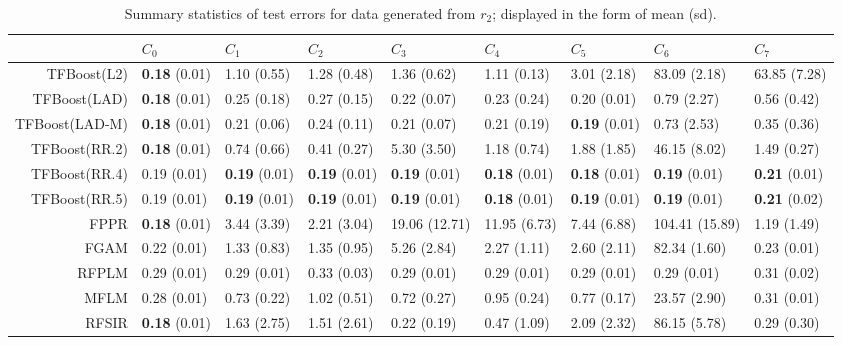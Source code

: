 \begin{table}[H]
\centering
\begin{tabular}{rllllllll}
  \hline
 & $C_0$ & $C_1$ & $C_2$ & $C_3$ & $C_4$ & $C_5$ & $C_6$ & $C_7$ \\ 
  \hline
TFBoost(L2) & \textbf{0.18} (0.01) & 1.10 (0.55) & 1.28 (0.48) & 1.36 (0.62) & 1.11 (0.13) & 3.01 (2.18) & 83.09 (2.18) & 63.85 (7.28) \\ 
  TFBoost(LAD) & \textbf{0.18} (0.01) & 0.25 (0.18) & 0.27 (0.15) & 0.22 (0.07) & 0.23 (0.24) & 0.20 (0.01) & 0.79 (2.27) & 0.56 (0.42) \\ 
  TFBoost(LAD-M) & \textbf{0.18} (0.01) & 0.21 (0.06) & 0.24 (0.11) & 0.21 (0.07) & 0.21 (0.19) & \textbf{0.19} (0.01) & 0.73 (2.53) & 0.35 (0.36) \\ 
  TFBoost(RR.2) & \textbf{0.18} (0.01) & 0.74 (0.66) & 0.41 (0.27) & 5.30 (3.50) & 1.18 (0.74) & 1.88 (1.85) & 46.15 (8.02) & 1.49 (0.27) \\ 
  TFBoost(RR.4) & 0.19 (0.01) & \textbf{0.19} (0.01) & \textbf{0.19} (0.01) & \textbf{0.19} (0.01) & \textbf{0.18} (0.01) & \textbf{0.18} (0.01) & \textbf{0.19} (0.01) & \textbf{0.21} (0.01) \\ 
  TFBoost(RR.5) & 0.19 (0.01) & \textbf{0.19} (0.01) & \textbf{0.19} (0.01) & \textbf{0.19} (0.01) & \textbf{0.18} (0.01) & \textbf{0.19} (0.01) & \textbf{0.19} (0.01) & \textbf{0.21} (0.02) \\ 
  FPPR & \textbf{0.18} (0.01) & 3.44 (3.39) & 2.21 (3.04) & 19.06 (12.71) & 11.95 (6.73) & 7.44 (6.88) & 104.41 (15.89) & 1.19 (1.49) \\ 
  FGAM & 0.22 (0.01) & 1.33 (0.83) & 1.35 (0.95) & 5.26 (2.84) & 2.27 (1.11) & 2.60 (2.11) & 82.34 (1.60) & 0.23 (0.01) \\ 
  RFPLM & 0.29 (0.01) & 0.29 (0.01) & 0.33 (0.03) & 0.29 (0.01) & 0.29 (0.01) & 0.29 (0.01) & 0.29 (0.01) & 0.31 (0.02) \\ 
  MFLM & 0.28 (0.01) & 0.73 (0.22) & 1.02 (0.51) & 0.72 (0.27) & 0.95 (0.24) & 0.77 (0.17) & 23.57 (2.90) & 0.31 (0.01) \\ 
  RFSIR & \textbf{0.18} (0.01) & 1.63 (2.75) & 1.51 (2.61) & 0.22 (0.19) & 0.47 (1.09) & 2.09 (2.32) & 86.15 (5.78) & 0.29 (0.30) \\ 
   \hline
\end{tabular}
\caption{Summary statistics of test errors for data generated from $r_2$; displayed in the form of mean (sd).} 
\end{table}
